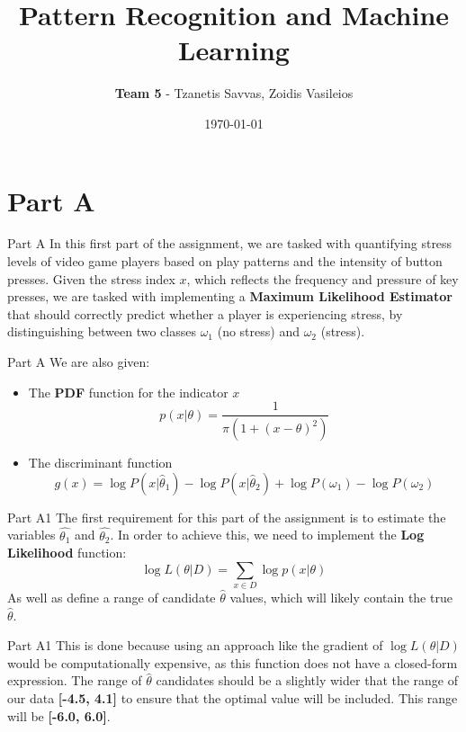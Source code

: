 \documentclass{beamer}
\title{Pattern Recognition and Machine Learning}
\author{\textbf{Team 5} - Tzanetis Savvas, Zoidis Vasileios}
\date{\today}
\begin{document}
\begin{frame}
    \titlepage
\end{frame}

\section{Part A}
    \begin{frame}{Part A}    
    In this first part of the assignment, we are tasked with quantifying stress levels of video game players based on play patterns
    and the intensity of button presses. Given the stress index $x$, which reflects the frequency and pressure of key presses, we are
    tasked with implementing a \textbf{Maximum Likelihood Estimator} that should correctly predict whether a player is experiencing
    stress, by distinguishing between two classes $\omega_1$ (no stress) and $\omega_2$ (stress).
    \end{frame}

    \begin{frame}{Part A}
    We are also given:
    \begin{itemize}
    \item The \textbf{PDF} function for the indicator $x$ 
    \[
    p(x|\theta) = \frac{1}{\pi(1+(x-\theta)^2)}
    \]
    \item The discriminant function
    \[
    g(x) = \log{P(x|\hat{\theta}_1)} - \log{P(x|\hat{\theta}_2)} + \log{P(\omega_1)} - \log{P(\omega_2)}
    \]
    \end{itemize}
    \end{frame}

    \begin{frame}{Part A1}
    The first requirement for this part of the assignment is to estimate the variables $\hat{\theta_1}$ and $\hat{\theta_2}$.
    In order to achieve this, we need to implement the \textbf{Log Likelihood} function:
    \[
    \log{L(\theta|D) = \sum_{x \in D}\log{p(x|\theta)}}
    \]
    As well as define a range of candidate $\hat{\theta}$ values, which will likely contain the true $\hat{\theta}$. 
    \end{frame}

    \begin{frame}{Part A1}
    This is done because using an approach like the gradient of $\log{L(\theta | D)}$ would be computationally expensive, as
    this function does not have a closed-form expression. The range of $\hat{\theta}$ candidates should be a slightly wider 
    that the range of our data \textbf{[-4.5,  4.1]} to ensure that the optimal value will be included. This range will be 
    \textbf{[-6.0, 6.0]}.
    \end{frame}
\end{document}

